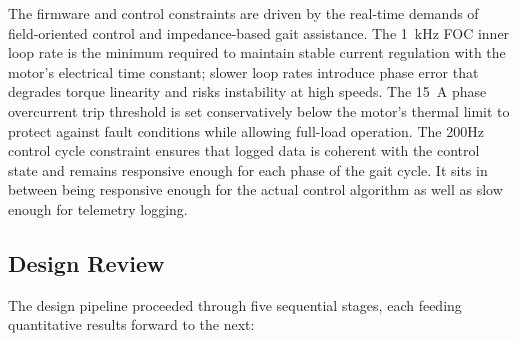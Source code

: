 \documentclass[11pt]{article}
\begin{document}
\vspace{10px}
The firmware and control constraints are driven by the real-time demands of field-oriented control and impedance-based gait assistance. The 1~kHz FOC inner loop rate is the minimum required to maintain stable current regulation with the motor's electrical time constant; slower loop rates introduce phase error that degrades torque linearity and risks instability at high speeds. 
The 15~A phase overcurrent trip threshold is set conservatively below the motor's thermal limit to protect against fault conditions while allowing full-load operation. 
The 200Hz control cycle constraint ensures that logged data is coherent with the control state and remains responsive enough for each phase of the gait cycle. It sits in between
being responsive enough for the actual control algorithm as well as slow enough for telemetry logging.

\subsection{Design Review}

The design pipeline proceeded through five sequential stages, each feeding quantitative results forward to the next:
\end{document}
